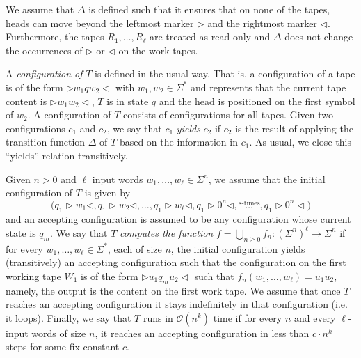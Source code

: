 We assume that $\Delta$ is defined such that it ensures that on none of the tapes, heads can move beyond 
the leftmost marker $\rhd$ and the rightmost marker $\lhd$. Furthermore, the tapes $R_1,\ldots,R_\ell$ are treated as read-only and $\Delta$ does not change the 
occurrences of $\rhd$ or $\lhd$ on the work tapes.

A \textit{configuration of} $T$ is defined in the usual way. That is, a configuration of a tape is of the form
$\rhd w_1qw_2\lhd$ with $w_1,w_2\in\Sigma^*$ and represents that the current tape content is 
$\rhd w_1w_2\lhd$, $T$ is in state $q$ and the head is positioned on the first symbol of $w_2$. 
A configuration of $T$ consists of configurations for all tapes. Given two configurations 
$c_1$ and $c_2$, we say that $c_1$ \textit{yields} $c_2$ if $c_2$ is the result of applying the transition 
function $\Delta$ of $T$ based on the information in $c_1$. As usual, we close this ``yields'' relation 
transitively.

Given $n > 0$ and $\ell$ input words $w_1,\ldots,w_\ell\in\Sigma^n$, we assume that the initial configuration of 
$T$ is given by
$$
\bigl(q_1 \!\rhd\! w_1\lhd,q_1\!\rhd\! w_2\lhd,\ldots, q_1\!\rhd\! w_\ell\lhd, q_1\!\rhd\! 0^n \lhd, \overset{\text{$s$-times}}{\ldots}, q_1\!\rhd\! 0^n \lhd \bigr)
$$ and an 
accepting configuration is assumed to be any configuration whose current state is $q_m$. We say that $T$ \textit{computes the function} $f=\bigcup_{n\geq 0} f_n:(\Sigma^n)^\ell\to\Sigma^n$ if for every
$w_1,\ldots,w_\ell\in\Sigma^*$, each of size $n$, the initial configuration yields (transitively) an accepting 
configuration such that the configuration on the first working tape $W_1$ is of the form $\rhd u_1 q_m u_2\lhd$ such that $f_n(w_1,\ldots,w_\ell) = u_1u_2$, namely, the output is the content on the first work tape. 
We assume that once $T$ reaches an accepting configuration it stays indefinitely in that configuration 
(i.e. it loops).
Finally, we say that $T$ runs in $\mathcal{O}(n^{k})$ time if for every $n$ and every $\ell$-input words of size $n$, it reaches an accepting configuration in less than $c\cdot n^{k}$ steps for some fix constant $c$.




